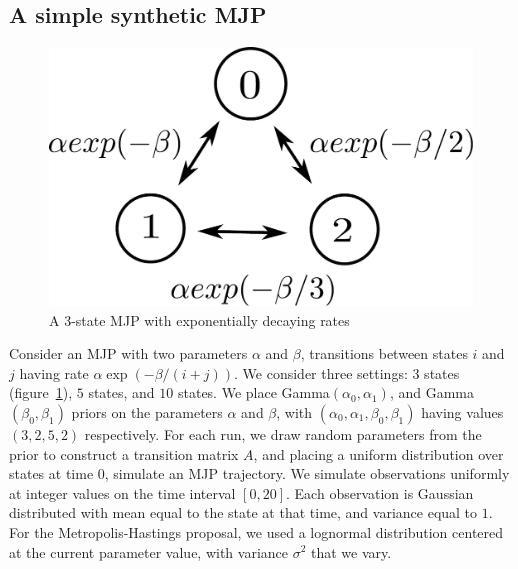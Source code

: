 \subsection{A simple synthetic MJP}
\begin{figure}
  \begin{minipage}[!hp]{.15\linewidth}
    \hspace{.1in}
  \end{minipage}
  \begin{minipage}[!hp]{.8\linewidth}
  \centering
    \includegraphics [width=\textwidth, angle=0]{figs/exp_model.pdf}
    \caption{A 3-state MJP with exponentially decaying rates}
    \label{fig:exp_model}
      \end{minipage}
    \vspace{-.1in}
  \end{figure}
Consider an MJP with two parameters $\alpha$ and $\beta$, 
transitions between states $i$ and $j$ having rate $\alpha \exp(-\beta/(i+j))$.
We consider three settings: $3$ states (figure~\ref{fig:exp_model}),
$5$ states, and $10$ states.
We place Gamma$(\alpha_0,\alpha_1)$, and Gamma$(\beta_0, \beta_1)$ priors on 
the parameters $\alpha$ and $\beta$, with $(\alpha_0,\alpha_1,\beta_0,\beta_1)$ 
having values $(3,2,5,2)$ respectively. For each run, we draw random parameters 
from the prior to construct a transition matrix $A$, and placing a uniform 
distribution over states at time $0$, simulate an MJP trajectory.
We simulate observations uniformly at integer values on the time interval 
$[0, 20]$. Each observation is Gaussian distributed with mean equal to the state
at that time, and variance equal to $1$.  For the Metropolis-Hastings proposal, 
we used a lognormal distribution centered at the current parameter value, 
with variance $\sigma^2$ that we vary.
